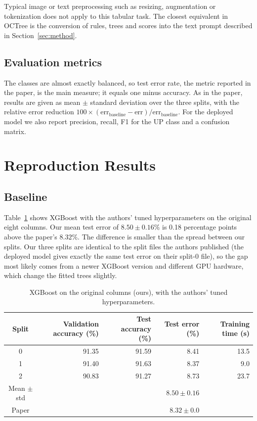 \documentclass[11pt]{article}
\begin{document}
Typical image or text preprocessing such as resizing, augmentation or tokenization does not apply
to this tabular task. The closest equivalent in OCTree is the conversion of rules, trees and scores
into the text prompt described in Section~\ref{sec:method}.

\subsection{Evaluation metrics}

The classes are almost exactly balanced, so test error rate, the metric reported in the paper, is the
main measure; it equals one minus accuracy. As in the paper, results are given as mean $\pm$ standard
deviation over the three splits, with the relative error reduction
$100\times(\text{err}_{\text{baseline}}-\text{err})/\text{err}_{\text{baseline}}$. For the deployed
model we also report precision, recall, F1 for the UP class and a confusion matrix.

\section{Reproduction Results}\label{sec:repro}

\subsection{Baseline}
Table~\ref{tab:baseline} shows XGBoost with the authors' tuned hyperparameters on the original eight
columns. Our mean test error of $8.50\pm0.16\%$ is 0.18 percentage points above the paper's
$8.32\%$. The difference is smaller than the spread between our splits. Our three splits are
identical to the split files the authors published (the deployed model gives exactly the same test
error on their split-0 file), so the gap most likely comes from a newer XGBoost version and different
GPU hardware, which change the fitted trees slightly.

\begin{table}[H]
\centering
\caption{XGBoost on the original columns (ours), with the authors' tuned hyperparameters.}
\label{tab:baseline}
\begin{tabular}{@{}crrrr@{}}
\toprule
Split & Validation accuracy (\%) & Test accuracy (\%) & Test error (\%) & Training time (s) \\
\midrule
0 & 91.35 & 91.59 & 8.41 & 13.5 \\
1 & 91.40 & 91.63 & 8.37 & 9.0 \\
2 & 90.83 & 91.27 & 8.73 & 23.7 \\
\midrule
Mean $\pm$ std & & & $8.50\pm0.16$ & \\
Paper & & & $8.32\pm0.0$ & \\
\bottomrule
\end{tabular}
\end{table}
\end{document}
